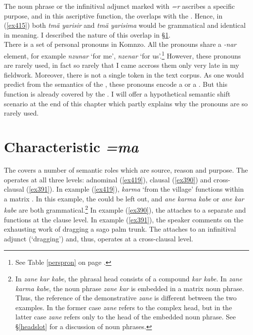 The noun phrase or the infinitival adjunct marked with \emph{=r} ascribes a specific purpose, and in this ascriptive function, the  overlaps with the  . Hence, in (\ref{ex415}) both \emph{tmä yarisir} and \emph{tmä yarisima} would be grammatical and identical in meaning. I described the nature of this overlap in \S{}\ref{charcase}.\\

There is a set of  personal pronouns in Komnzo. All the pronouns share a \emph{-nar} element, for example \emph{nzunar} `for me', \emph{nzenar} `for us'.\footnote{See Table \ref{perspron} on page \pageref{perspron}.} However, these pronouns are rarely used, in fact so rarely that I came accross them only very late in my fieldwork. Moreover, there is not a single token in the text corpus. As one would predict from the semantics of the  , these pronouns encode a  or a . But this function is already covered by the  . I will offer a hypothetical semantic shift scenario at the end of this chapter which partly explains why the  pronouns are so rarely used.

\section{Characteristic \emph{=ma}} \label{charcase}

The   covers a number of semantic roles which are source, reason and purpose. The  operates at all three levels: adnominal (\ref{ex419}), clausal (\ref{ex390}) and cross-clausal (\ref{ex391}). In example (\ref{ex419}), \emph{karma} `from the village' functions within a matrix . In this example, the  could be left out, and \emph{ane karma kabe} or \emph{ane kar kabe} are both grammatical.\footnote{In \emph{zane kar kabe}, the phrasal head consists of a compound \emph{kar kabe}. In \emph{zane karma kabe}, the noun phrase \emph{zane kar} is embedded in a matrix noun phrase. Thus, the reference of the demonstrative \emph{zane} is different between the two examples. In the former case \emph{zane} refers to the complex head, but in the latter case \emph{zane} refers only to the head of the embedded noun phrase. See \S{}\ref{headslot} for a discussion of noun phrases.} In example (\ref{ex390}), the   attaches to a separate  and functions at the clause level. In example (\ref{ex391}), the speaker comments on the exhausting work of dragging a sago palm trunk. The   attaches to an infinitival adjunct (`dragging') and, thus, operates at a cross-clausal level.

